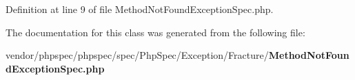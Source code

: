 Definition at line 9 of file Method\+Not\+Found\+Exception\+Spec.\+php.



The documentation for this class was generated from the following file\+:\begin{DoxyCompactItemize}
\item 
vendor/phpspec/phpspec/spec/\+Php\+Spec/\+Exception/\+Fracture/{\bf Method\+Not\+Found\+Exception\+Spec.\+php}\end{DoxyCompactItemize}

